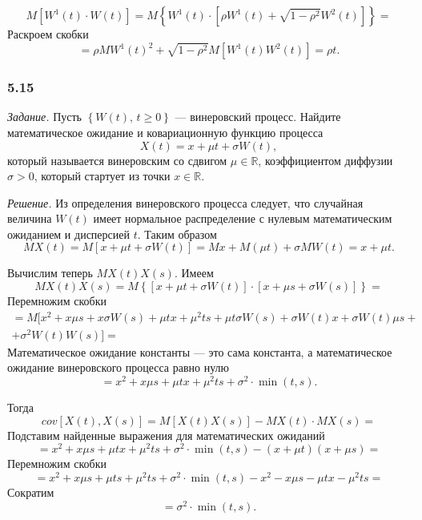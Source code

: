 $$M \left[ W^1 \left( t \right) \cdot W \left( t \right) \right] =
  M \left\{
    W^1 \left( t \right) \cdot
    \left[ \rho W^1 \left( t \right) + \sqrt{1 - \rho^2} W^2 \left( t \right) \right] \right\} =$$
Раскроем скобки
$$= \rho MW^1 \left( t \right)^2 +
  \sqrt{1 - \rho^2} M \left[ W^1 \left( t \right) W^2 \left( t \right) \right] =
  \rho t.$$

\subsubsection*{5.15}

\textit{Задание.}
Пусть $ \left\{ W \left( t \right), \, t \geq 0 \right\} $ --- винеровский процесс.
Найдите математическое ожидание и ковариационную функцию процесса
$$X \left( t \right) =
  x + \mu t + \sigma W \left( t \right),$$
который называется винеровским со сдвигом $ \mu \in \mathbb{R}$,
коэффициентом диффузии $ \sigma > 0$, который стартует из точки $x \in \mathbb{R}$.

\textit{Решение.}
Из определения винеровского процесса следует, что случайная величина $W \left( t \right) $
имеет нормальное распределение с нулевым математическим ожиданием и дисперсией $t$.
Таким образом
$$MX \left( t \right) =
  M \left[ x + \mu t +  \sigma W \left( t \right) \right] =
  Mx + M \left( \mu t \right) + \sigma MW \left( t \right) =
  x + \mu t.$$

Вычислим теперь $MX \left( t \right) X \left( s \right) $.
Имеем
$$MX \left( t \right) X \left( s \right) =
  M \left\{
    \left[ x + \mu t + \sigma W \left( t \right) \right] \cdot
    \left[ x + \mu s + \sigma W \left( s \right) \right] \right\} =$$
Перемножим скобки
\begin{gather*}
  = M[
    x^2 + x \mu s + x \sigma W \left( s \right) + \mu tx + \mu^2 ts +
    \mu t \sigma W \left( s \right) + \sigma W \left( t \right) x +
    \sigma W \left( t \right) \mu s + \\
    + \sigma^2 W \left( t \right) W \left( s \right) ] =
\end{gather*}
Математическое ожидание константы --- это сама константа,
а математическое ожидание винеровского процесса равно нулю
$$= x^2 + x \mu s + \mu tx + \mu^2 ts+ \sigma^2 \cdot \min \left( t, s \right).$$

Тогда
$$cov \left[ X \left( t \right), X \left( s \right) \right] =
  M \left[ X \left( t \right) X \left( s \right) \right] -
  MX \left( t \right) \cdot MX \left( s \right) =$$
Подставим найденные выражения для математических ожиданий
$$= x^2 + x \mu s + \mu tx + \mu^2 ts + \sigma^2 \cdot \min \left( t, s \right) -
  \left( x + \mu t \right) \left( x + \mu s \right) =$$
Перемножим скобки
$$= x^2 + x \mu s + \mu ts + \mu^2 ts + \sigma^2 \cdot \min \left( t, s \right) - x^2 - x \mu s -
  \mu tx - \mu^2 ts =$$
Сократим
$$= \sigma^2 \cdot \min \left( t, s \right).$$

